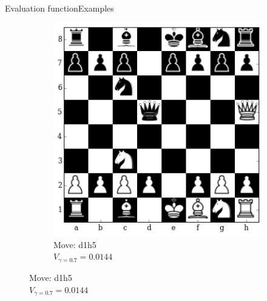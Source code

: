 \documentclass[9pt, unknownkeysallowed]{beamer}
\begin{document}
\begin{frame}{Evaluation function}{Examples}
{\begin{figure}[H]
\begin{subfigure}[t]{0.3\textwidth}
    \includegraphics[width=\textwidth]{../img/table_evaluations/output_11_4.png}
        \caption{Move: d1h5\\
        $V_{\gamma=0.7}=0.0144$}
    \end{subfigure}
    \end{figure}
}
\end{frame}
\end{document}
